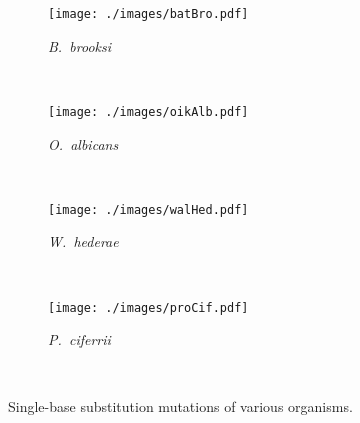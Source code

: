\documentclass{article}
\begin{document}
\begin{figure}[h!]
    \centering
    \begin{subfigure}{\textwidth}
      \centering
      \texttt{[image: ./images/batBro.pdf]}
      \caption{\textit{B.~brooksi}}
      \label{fig:fig1a}
    \end{subfigure}\\

    \begin{subfigure}{\textwidth}
      \centering
      \texttt{[image: ./images/oikAlb.pdf]}
      \caption{\textit{O.~albicans}}
      \label{fig:fig1m}
    \end{subfigure}\\

    \begin{subfigure}{\textwidth}
      \centering
      \texttt{[image: ./images/walHed.pdf]}
      \caption{\textit{W.~hederae}}
      \label{fig:fig1i}
    \end{subfigure}\\

    \begin{subfigure}{\textwidth}
      \centering
      \texttt{[image: ./images/proCif.pdf]}
      \caption{\textit{P.~ciferrii}}
      \label{fig:fig1l}
    \end{subfigure}\\

    \caption{Single-base substitution mutations of various organisms.}
    \label{fig:fig1}
\end{figure}


\end{document}
